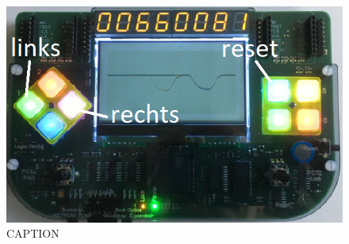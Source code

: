         \begin{figure}[H]
            \centering
            \includegraphics[scale=0.5]{img/board.png}    
            \caption{CAPTION}
        \end{figure}